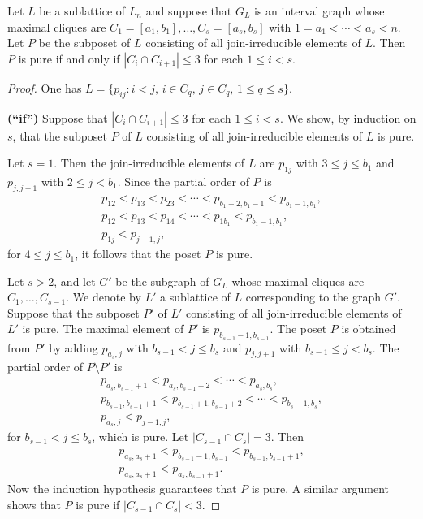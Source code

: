 \documentclass[10pt,a4paper]{amsart}
\begin{document}
\begin{Lemma}
    \label{Gor}
    Let $L$ be a sublattice of $L_n$ and suppose that $G_L$ is an interval graph whose maximal cliques are $C_1 =[a_1, b_1], \ldots, C_s=[a_s, b_s]$ with $1=a_1 < \cdots < a_s < n$.  
Let $P$ be the subposet of $L$ consisting of all join-irreducible elements of $L$.  Then $P$ is pure if and only if $|C_i \cap C_{i+1}| \leq 3$ for each $1 \leq i < s$.  
\end{Lemma}

\begin{proof}
One has 
$
L=\{p_{ij} : i<j, \, i\in C_q, \, j \in C_q, \, 1 \leq q \leq s \}.  
$

\smallskip

\noindent
{\bf (``if'')} Suppose that $|C_i \cap C_{i+1}| \leq 3$ for each $1 \leq i < s$.
We show, by induction on $s$, that the subposet $P$ of $L$ consisting
of all join-irreducible elements of $L$ is pure.

Let $s = 1$. Then the join-irreducible elements of $L$ are
$p_{1j}$ with $3 \leq j \leq b_1$ and $p_{j,j+1}$ with
$2 \leq j < b_1$.
Since the partial order of $P$ is
\begin{eqnarray*}
&p_{12} < p_{13} < p_{23} < \cdots < p_{b_1-2, b_1 - 1} < p_{b_1-1,b_1},&\\
&p_{12} < p_{13} < p_{14} < \cdots < p_{1b_1} < p_{b_1-1,b_1},&\\
& p_{1j} < p_{j-1,j},
\end{eqnarray*}
for $4 \leq j \leq b_1$, it follows that the poset $P$ is pure.

Let $s > 2$, and let $G'$ be the subgraph of $G_L$ whose maximal cliques
are $C_1, \ldots, C_{s-1}$. We denote by $L'$ a sublattice of $L$ corresponding to the graph $G'$.
Suppose that the subposet $P'$ of $L'$ consisting of all
join-irreducible elements of $L'$ is pure.
The maxi\-mal element of $P'$ is $p_{b_{s-1}-1, b_{s-1}}$.
The poset $P$ is obtained from $P'$ by adding $p_{a_s, j}$ with
$b_{s-1} < j \leq b_s$ and $p_{j,j+1}$ with
$b_{s-1} \leq j < b_s$.
The partial order of $P\setminus P'$ is
\begin{eqnarray*}
&p_{a_s, b_{s-1}+1} < p_{a_s, b_{s-1}+2} < \cdots < p_{a_s, b_s},&\\
&p_{b_{s-1}, b_{s-1}+1} < p_{b_{s-1}+1, b_{s-1}+2}
< \cdots < p_{b_s-1,b_s},&\\
& p_{a_s,j} < p_{j-1,j}, 
\end{eqnarray*}
for $b_{s-1} < j \leq b_s$, which is pure.
Let $|C_{s-1} \cap C_s| = 3$. Then
\begin{eqnarray*}
&p_{a_s, a_s+1} < p_{b_{s-1}-1,b_{s-1}} < p_{b_{s-1}, b_{s-1}+1},&\\
&p_{a_s, a_s+1} < p_{a_s, b_{s-1}+1}.&
\end{eqnarray*}
Now the induction hypothesis guarantees that $P$ is pure.
A similar argument shows that $P$ is pure if
$|C_{s-1} \cap C_s| < 3$.


\end{proof}
\end{document}
